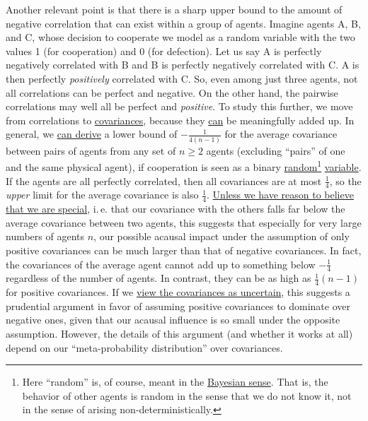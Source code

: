 Another relevant point is that there is a sharp upper bound to the
amount of negative correlation that can exist within a group of agents.
Imagine agents A, B, and C, whose decision to cooperate we model as a
random variable with the two values 1 (for cooperation) and 0 (for
defection). Let us say A is perfectly negatively correlated with B and B
is perfectly negatively correlated with C. A is then perfectly
\emph{positively} correlated with C. So, even among just three agents,
not all correlations can be perfect and negative. On the other hand, the
pairwise correlations may well all be perfect and \emph{positive}. To
study this further, we move from correlations to
\href{https://en.wikipedia.org/wiki/Covariance}{covariances},
because they
\href{https://en.wikipedia.org/wiki/Covariance\#Properties}{can}
be meaningfully added up. In general, we
\href{https://casparoesterheld.files.wordpress.com/2017/01/lowerboundavgcov.pdf}{can
derive} a lower bound of \(- \frac{1}{4(n - 1)}\) for the average
covariance between pairs of agents from any set of \(n \geq 2\) agents
(excluding ``pairs'' of one and the same physical agent), if cooperation
is seen as a binary
\href{https://en.wikipedia.org/wiki/Random_variable}{random}\footnote{Here
  ``random'' is, of course, meant in the
  \href{https://en.wikipedia.org/wiki/Bayesian_probability}{Bayesian
  sense}. That is, the behavior of other agents is random in the sense
  that we do not know it, not in the sense of arising
  non-deterministically.}
\href{https://en.wikipedia.org/wiki/Random_variable}{variable}.
If the agents are all perfectly correlated, then all covariances are at
most \(\frac{1}{4}\), so the \emph{upper} limit for the average
covariance is also \(\frac{1}{4}\).
\href{https://en.wikipedia.org/wiki/Mediocrity_principle}{Unless
we have reason to believe that we are special}, i.\,e. that our
covariance with the others falls far below the average covariance
between two agents, this suggests that especially for very large numbers
of agents \(n\), our possible acausal impact under the assumption of
only positive covariances can be much larger than that of negative
covariances. In fact, the covariances of the average agent cannot add up
to something below \(- \frac{1}{4}\) regardless of the number of agents.
In contrast, they can be as high as \(\frac{1}{4}(n - 1)\) for positive
covariances. If we
\href{https://casparoesterheld.com/2016/10/21/environmental-and-logical-uncertainty-reported-environmental-probabilities-as-expected-environmental-probabilities-under-logical-uncertainty/}{view
the covariances as uncertain}, this suggests a prudential argument in
favor of assuming positive covariances to dominate over negative ones,
given that our acausal influence is so small under the opposite
assumption. However, the details of this argument (and whether it works
at all) depend on our ``meta-probability distribution'' over
covariances.

